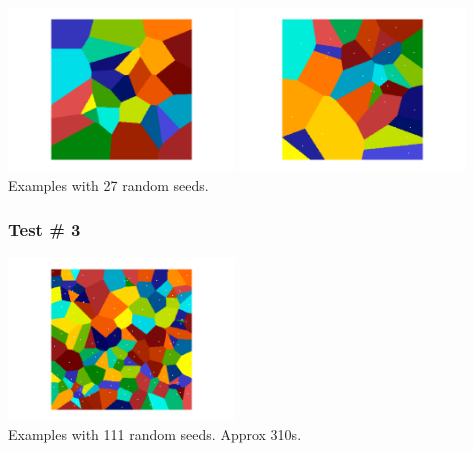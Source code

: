 \begin{center}
\includegraphics[width=6cm]{python_codes/fieldstone_125/results/test2_a}
\includegraphics[width=6cm]{python_codes/fieldstone_125/results/test2_b}\\
{\captionfont Examples with 27 random seeds.}
\end{center}

\subsubsection*{Test \# 3}

\begin{center}
\includegraphics[width=6cm]{python_codes/fieldstone_125/results/test3}\\
{\captionfont Examples with 111 random seeds. Approx 310s.}
\end{center}




